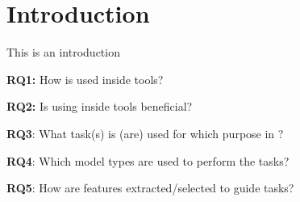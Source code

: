 \section{Introduction}

This is an introduction~\cite{Domingos:2015}

\noindent
\textbf{RQ1:} How is \ML used inside \RE tools?

\noindent
\textbf{RQ2:} Is using \ML inside \RE tools beneficial?

\noindent
\textbf{RQ3}: What \ML task(s) is (are) used for which purpose in \RE?

\noindent
\textbf{RQ4}: Which model types are used to perform the \RE tasks?

\noindent
\textbf{RQ5}: How are \ML features extracted/selected to guide \RE tasks?


